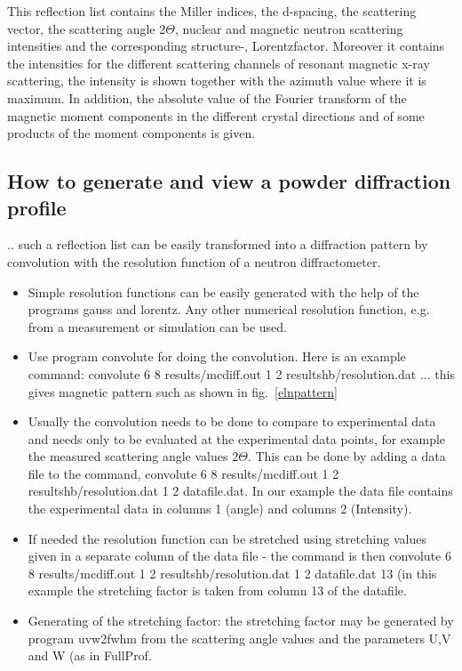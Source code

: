 This reflection list contains the Miller indices, the d-spacing, the scattering vector,
the scattering angle 2$\Theta$, nuclear and magnetic neutron scattering intensities
and the corresponding structure-, Lorentzfactor. Moreover it contains the
intensities for the different scattering channels of resonant magnetic x-ray scattering,
the intensity is shown together with the azimuth value where it is maximum. In addition,
the absolute value of the Fourier transform of the magnetic moment components in the different
crystal directions and of some products of the moment components is given.

\subsection{How to generate and view a powder diffraction profile}


.. such a reflection list can be easily transformed into a diffraction pattern
by convolution with the resolution function of a neutron diffractometer.

\begin{itemize}
\item
Simple resolution functions can be easily generated with the help of the programs
{\prg gauss} and {\prg lorentz}. Any other numerical
resolution function, e.g. from a measurement or simulation can be used.
\item
Use program  {\prg convolute} for doing the convolution. 
Here is an example command: 
{\prg convolute 6 8  results/mcdiff.out
1 2 resultshb/resolution.dat}
... this gives magnetic pattern such as shown in fig.~\ref{elnpattern}
\item Usually the convolution needs to be done to compare to experimental
data and needs only to be evaluated at the experimental data points, for
example the measured scattering angle values $2\Theta$. This can be 
done by adding a data file to the command,
{\prg convolute 6 8  results/mcdiff.out
1 2 resultshb/resolution.dat 1 2 datafile.dat}. In our example the
data file contains the experimental data in columns 1 (angle) and columns 2 (Intensity).
\item If needed the resolution function can be stretched using stretching
values given in a separate column of the data file - the command is then
{\prg convolute 6 8  results/mcdiff.out
1 2 resultshb/resolution.dat 1 2 datafile.dat 13} (in this example the stretching
factor is taken from column 13 of the datafile.
\item Generating of the stretching factor: the stretching factor
may be generated by program {\prg uvw2fwhm} from
the scattering angle values and the parameters U,V and W (as in {\prg FullProf}.

\end{itemize}

